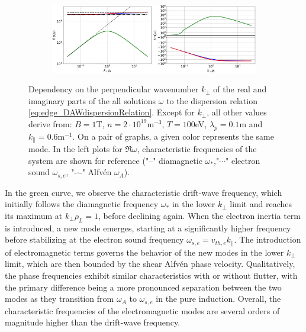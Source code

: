 \begin{figure}[H]
	\ContinuedFloat
	\centering
	\begin{subfigure}[t]{0.85\textwidth}
		\centering
		\includegraphics[width=1\textwidth]{schemes/modes_EM-flutter.jpg}
		\label{fig:edge_modesFlutter}
	\end{subfigure}
	\caption{Dependency on the perpendicular wavenumber $k_\perp$ of the real and imaginary parts of the all solutions $\omega$ to the dispersion relation \ref{eq:edge_DAWdispersionRelation}. Except for $k_\perp$, all other values derive from: $B = 1$T, $n = 2\cdot10^{19}$m$^{-3}$, $T = 100$eV, $\lambda_p = 0.1$m and $k_\parallel = 0.6$m$^{-1}$. On a pair of graphs, a given color represents the same mode. In the left plots for $\Re{\omega}$, characteristic frequencies of the system are shown for reference ("--" diamagnetic $\omega_*$,"$\cdots$" electron sound $\omega_{s,e}$, "-$\cdot$-" Alfvén $\omega_A$).} 
	\label{fig:edge_modalBehavior}
\end{figure}

In the green curve, we observe the characteristic drift-wave frequency, which initially follows the diamagnetic frequency $\omega_*$ in the lower $k_\perp$ limit and reaches its maximum at $k_\perp \rho_L = 1$, before declining again. When the electron inertia term is introduced, a new mode emerges, starting at a significantly higher frequency before stabilizing at the electron sound frequency $\omega_{s,e} = v_{th,e} k_\parallel$. The introduction of electromagnetic terms governs the behavior of the new modes in the lower $k_\perp$ limit, which are then bounded by the shear Alfvén phase velocity. Qualitatively, the phase frequencies exhibit similar characteristics with or without flutter, with the primary difference being a more pronounced separation between the two modes as they transition from $\omega_A$ to $\omega_{s,e}$ in the pure induction. Overall, the characteristic frequencies of the electromagnetic modes are several orders of magnitude higher than the drift-wave frequency.

